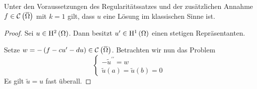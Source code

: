 \begin{lemma}[Korollar]
	Unter den Voraussetzungen des Regularitätssatzes und der zusätzlichen Annahme $f\in\C\left(\overbar{\W}\right)$ mit $k=1$ gilt, dass $u$ eine Lösung im klassischen Sinne ist.
\end{lemma}
\begin{proof}
	Sei $u\in\mathrm{H}^{2}\left(\Omega\right)$. Dann besitzt $u^{\prime}\in\mathrm{H}^{1}\left(\Omega\right)$ einen stetigen Repräsentanten.
	
	Setze $w = -\left(f-cu^{\prime}-du\right)\in\C\left(\overbar{\W}\right)$. Betrachten wir nun das Problem
	\begin{equation*}
		\begin{cases}
			-\tilde{u}^{\prime\prime} = w\\
			\tilde{u}\left(a\right) = \tilde{u}\left(b\right)=0
		\end{cases}
	\end{equation*}
	Es gilt $\tilde{u} = u$ fast überall.
\end{proof}
